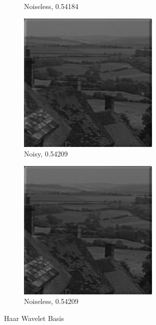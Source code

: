 \documentclass[a4paper]{article}
\begin{document}
\begin{figure}[H]
\begin{subfigure}{0.24\linewidth}
        \caption{Noiseless, 0.54184}
    \end{subfigure}
    \begin{subfigure}{0.24\linewidth}
        \centering
        \includegraphics[width = \linewidth]{haarWavelet/goldhill reconstructed using compressive measurements, with noise.png}
        \caption{Noisy, 0.54209}
    \end{subfigure}
    \begin{subfigure}{0.24\linewidth}
        \centering
        \includegraphics[width = \linewidth]{haarWavelet/goldhill reconstructed using compressive measurements, without noise.png}
        \caption{Noiseless, 0.54209}
    \end{subfigure}
    \caption{Haar Wavelet Basis}
    \label{fig:hwb}
\end{figure}
\end{document}
